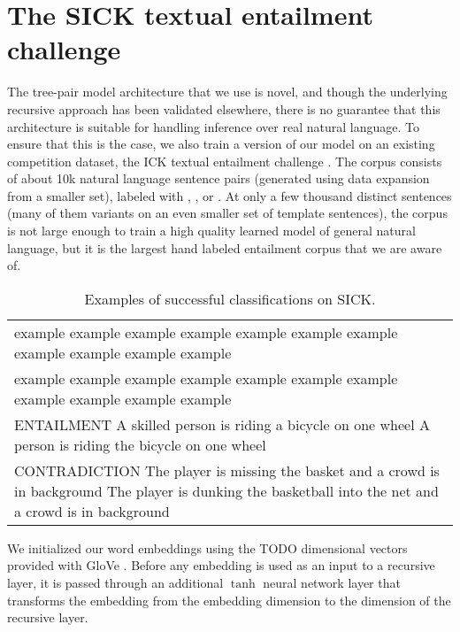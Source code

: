 \section{The SICK textual entailment challenge}

The tree-pair model architecture that we use is novel, and though the underlying recursive approach has been validated elsewhere, there is no guarantee that this architecture is suitable for handling inference over real natural language. To ensure that this is the case, we also train a version of our model on an existing competition dataset, the ICK textual entailment challenge \cite{marelli2014sick}. The corpus consists of about 10k natural language sentence pairs (generated using data expansion from a smaller set), labeled with , , or . At only a few thousand distinct sentences (many of them variants on an even smaller set of template sentences), the corpus is not large enough to train a high quality learned model of general natural language, but it is the largest hand labeled entailment corpus that we are aware of.

\begin{table*}[htp]
  \centering
  \begin{tabular}{l}
    \toprule
example example example example example example example example example example example \\
example example example example example example example example example example example \\
ENTAILMENT A skilled person is riding a bicycle on one wheel	A person is riding the bicycle on one wheel\\
CONTRADICTION The player is missing the basket and a crowd is in background	The player is dunking the basketball into the net and a crowd is in background\\
    \bottomrule
  \end{tabular}
  \caption{\label{examplesofsickdata}Examples of successful classifications on SICK.}
\end{table*}

We initialized our word embeddings using the TODO dimensional vectors provided with 
GloVe \cite{pennington2014glove}. Before any embedding is used as an input to a recursive layer, 
it is passed through an additional $\tanh$ neural network layer that transforms
the embedding from the embedding dimension to the dimension of the recursive layer.

